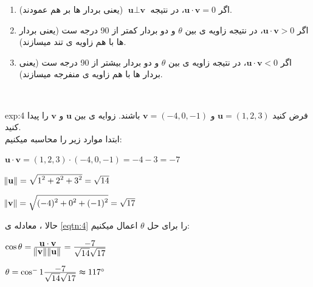 {\begin{spacing}{1.5}
        \begin{enumerate}
            \item {اگر $\textbf{u}\cdot\textbf{v}=0$، در نتیجه $\textbf{u}\perp\textbf{v}$ (یعنی بردار ها بر هم عمودند).}
            \item {اگر $\textbf{u}\cdot\textbf{v}>0$، در نتیجه زاویه ی بین $\theta$ و دو بردار کمتر از 90 درجه ست (یعنی بردار ها با هم زاویه ی تند میسازند).}
            \item {اگر $\textbf{u}\cdot\textbf{v}<0$، در نتیجه زاویه ی بین $\theta$ و دو بردار بیشتر از 90 درجه ست (یعنی بردار ها با هم زاویه ی منفرجه میسازند).}
        \end{enumerate} \\

        \begin{example}{exp:4}
            فرض کنید $\textbf{u}=(1,2,3)$ و $\textbf{v}=(-4,0,-1)$ باشند. زوایه ی بین $\textbf{u}$ و $\textbf{v}$ را پیدا کنید. \\
            ابتدا موارد زیر را محاسبه میکنیم:

            \begin{center}
                $\textbf{u}\cdot\textbf{v}=(1,2,3)\cdot(-4,0,-1)=-4-3=-7$

                $\norm{\textbf{u}}=\sqrt{\displaystyle 1^2+2^2+3^2}=\sqrt{\displaystyle 14}$

                $\norm{\textbf{v}}=\sqrt{\displaystyle (-4)^2+0^2+(-1)^2}=\sqrt{\displaystyle 17}$
            \end{center}

            حالا ، معادله ی \ref{eqtn:4} را برای حل $\theta$ اعمال میکنیم:

            \begin{center}
                $\cos\theta=\frac{\displaystyle\textbf{u}\cdot\textbf{v}}{\displaystyle\norm{\textbf{v}}\norm{\textbf{u}}}=\frac{\displaystyle -7}{\displaystyle \sqrt{\displaystyle 14}\sqrt{\displaystyle 17}}$

                $\theta=\cos^-1\frac{\displaystyle -7}{\displaystyle \sqrt{\displaystyle 14}\sqrt{\displaystyle 17}}\thickapprox117^\circ$
            \end{center}
        \end{example}


\end{spacing}}
